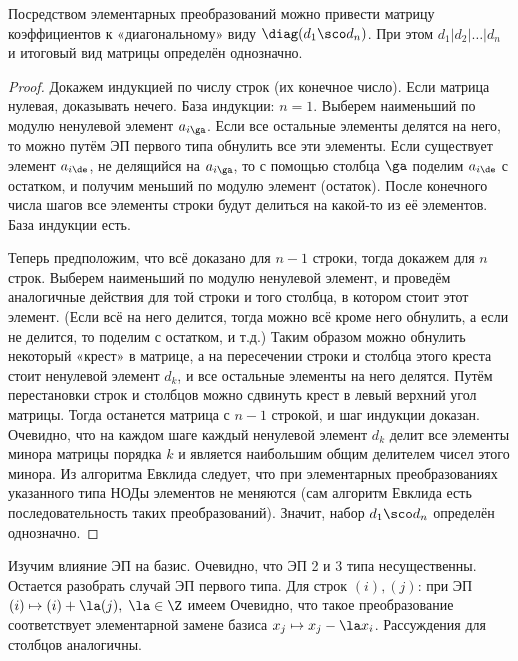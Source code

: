 \documentclass[a4paper]{article}
\begin{document}
\begin{theorem}
Посредством элементарных преобразований можно привести матрицу коэффициентов к «диагональному» виду
$\diag(d_1 \sco d_n)$. При этом $d_1 | d_2 | \ldots | d_n$ и итоговый вид матрицы определён однозначно.
\end{theorem}
\begin{proof}
Докажем индукцией по числу строк (их конечное число). Если матрица нулевая, доказывать нечего. База
индукции: $n=1$. Выберем наименьший по модулю ненулевой элемент $a_{i\ga}$. Если все остальные элементы
делятся на него, то можно путём ЭП первого типа обнулить все эти элементы. Если существует элемент
$a_{i\de}$, не делящийся на $a_{i\ga}$, то с помощью столбца $\ga$ поделим $a_{i\de}$ с остатком,
и получим меньший по модулю элемент (остаток). После конечного числа шагов все элементы строки будут делиться
на какой-то из её элементов. База индукции есть.

Теперь предположим, что всё доказано для $n-1$ строки, тогда докажем для $n$ строк. Выберем наименьший  по
модулю ненулевой элемент, и проведём аналогичные действия для той строки и того столбца, в котором стоит этот
элемент. (Если всё на него делится, тогда можно всё кроме него обнулить, а если не делится, то поделим с
остатком, и т.д.) Таким образом можно обнулить некоторый «крест» в матрице, а на пересечении строки и столбца
этого креста стоит ненулевой элемент $d_k$, и все остальные элементы на него делятся. Путём перестановки
строк и столбцов можно сдвинуть крест в левый верхний угол матрицы. Тогда останется матрица с $n-1$ строкой,
и шаг индукции доказан. Очевидно, что на каждом шаге каждый ненулевой элемент $d_k$ делит все элементы минора
матрицы порядка $k$ и является наибольшим общим делителем чисел этого минора. Из алгоритма Евклида следует,
что при элементарных преобразованиях указанного типа НОДы элементов не меняются (сам алгоритм Евклида есть
последовательность таких преобразований). Значит, набор $d_1 \sco d_n$ определён однозначно.
\end{proof}

Изучим влияние ЭП на базис. Очевидно, что ЭП 2 и 3 типа несущественны. Остается разобрать  случай ЭП первого
типа. Для строк $(i), (j)$: при ЭП $(i) \mapsto (i) + \la (j), \; \la \in \Z$ имеем  Очевидно, что такое
преобразование соответствует элементарной замене базиса $x_j \mapsto x_j-\la x_i$. Рассуждения для
столбцов аналогичны.
\end{document}
